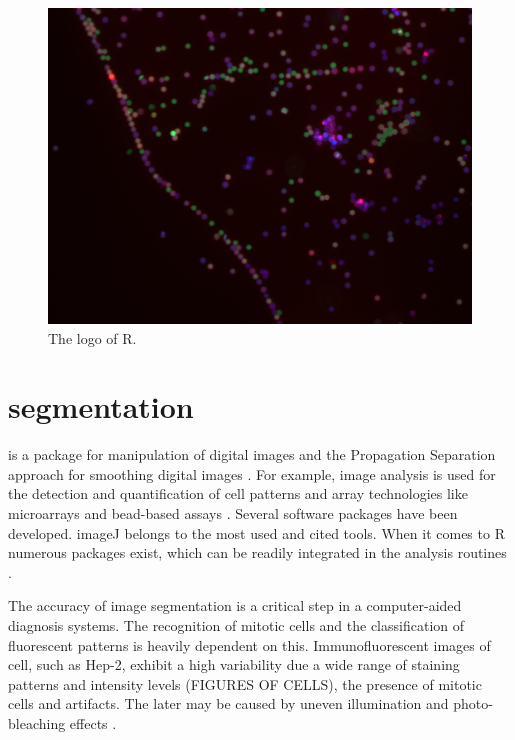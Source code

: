 \begin{figure}[htbp]
  \centering
  \includegraphics[clip=true,trim=0.1cm 0.3cm 0.2cm 0.1cm, width=12cm]{bead}
  \caption{The logo of R.}
  \label{figure:bead}
\end{figure}

\section{segmentation}

\citep{holmes_interactive_2009}

 is a package for manipulation of digital images and the 
Propagation Separation approach for smoothing digital images \citep{polzehl_adaptive_2007}.
For example, image analysis is used for the detection and quantification of 
cell patterns and array technologies like microarrays and bead-based assays 
\citep{rodiger_highly_2013, willitzki_new_2012, willitzki_fully_2013, 
dunning_beadarray:_2006}.
Several software packages have been developed. imageJ belongs to the most 
used and cited tools. When it comes to R numerous packages exist, which can 
be readily integrated in the analysis routines \citep{frery_introduction_2013}.

The accuracy of image segmentation is a critical step in a computer-aided 
diagnosis systems. The recognition of mitotic cells and the classification of 
fluorescent patterns is heavily dependent on this. Immunofluorescent images 
of cell, such as Hep-2, exhibit a high variability due a wide range of staining 
patterns and intensity levels (FIGURES OF CELLS), the presence of mitotic 
cells and  artifacts. The later may be caused by uneven illumination and 
photo-bleaching effects \citep{tonti_automated_2015}.

